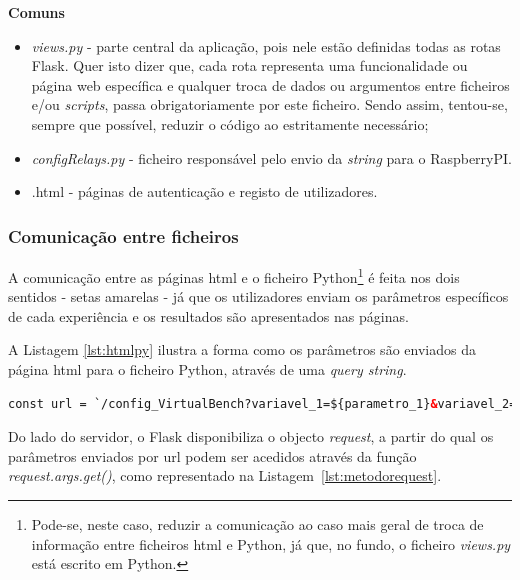 \textbf{Comuns}
\begin{itemize}
	\item \textit{views.py} - parte central da aplicação, pois nele estão definidas todas as rotas Flask. Quer isto dizer que, cada rota representa uma funcionalidade ou página web específica e qualquer troca de dados ou argumentos entre ficheiros e/ou \textit{scripts}, passa obrigatoriamente por este ficheiro. Sendo assim, tentou-se, sempre que possível, reduzir o código ao estritamente necessário;
	\item \textit{configRelays.py} - ficheiro responsável pelo envio da \textit{string} para o \gls{RaspberryPI}.
	\item {}.html - páginas de autenticação e registo de utilizadores.
\end{itemize}

\subsubsection{Comunicação entre ficheiros}
\label{sec:comunicacaoentrefich}
A comunicação entre as páginas \acrshort{html} e o ficheiro Python\footnote{Pode-se, neste caso, reduzir a comunicação ao caso mais geral de troca de informação entre ficheiros \acrshort{html} e Python, já que, no fundo, o ficheiro \textit{views.py} está escrito em Python.} é feita nos dois sentidos - setas amarelas - já que os utilizadores enviam os parâmetros específicos de cada experiência e os resultados são apresentados nas páginas. 

A Listagem \ref{lst:htmlpy} ilustra a forma como os parâmetros são enviados da página \acrshort{html} para o ficheiro Python, através de uma \textit{query string}.

\begin{minipage}{0.9\linewidth}
	\begin{lstlisting}[language=html, escapechar=|, caption=Envio de parâmetros \acrshort{html} $\rightarrow$ \textit{views.py}, label=lst:htmlpy]
	const url = `/config_VirtualBench?variavel_1=${parametro_1}&variavel_2=${parametro_2}&variavel_3=${parametro_3}`; |\label{line:parametros}|
	\end{lstlisting}
\end{minipage}

Do lado do servidor, o Flask disponibiliza o objecto \textit{request}, a partir do qual os parâmetros enviados por \acrshort{url} podem ser acedidos através da função \textit{request.args.get()}, como representado na Listagem~\ref{lst:metodorequest}.

